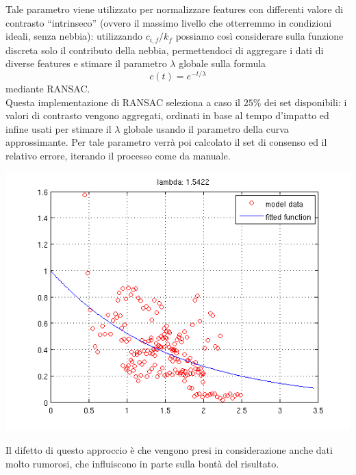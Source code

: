 \documentclass[12pt]{report}
\begin{document}
\noindent Tale parametro viene utilizzato per normalizzare features con differenti valore di contrasto ``intrinseco'' (ovvero il massimo livello che otterremmo in condizioni ideali, senza nebbia): utilizzando $c_{i,f}/k_f$ possiamo cos\`i considerare sulla funzione discreta solo il contributo della nebbia, permettendoci di aggregare i dati di diverse features e stimare il parametro $\lambda$ globale sulla formula $$ c(t) = e^{-t/\lambda} $$ mediante RANSAC.\\
Questa implementazione di RANSAC seleziona a caso il $25\%$ dei set disponibili: i valori di contrasto vengono aggregati, ordinati in base al tempo d'impatto ed infine usati per stimare il $\lambda$ globale usando il parametro della curva approssimante. Per tale parametro verr\`a poi calcolato il set di consenso ed il relativo errore, iterando il processo come da manuale.\\

\begin{center}
	\includegraphics[scale=0.75]{images/tryLam.png}
	\label{fig:tryLam}
\end{center}

\noindent Il difetto di questo approccio \`e che vengono presi in considerazione anche dati molto rumorosi, che influiscono in parte sulla bont\`a del risultato.
\end{document}
